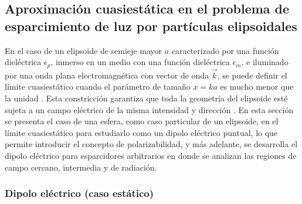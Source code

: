 \hypertarget{primera}{\subsection{Aproximación cuasiestática en el problema de esparcimiento de luz por partículas elipsoidales}}

 En el caso de un elipsoide de semieje mayor $a$ caracterizado por una función dieléctrica $\epsilon_p$, inmerso en un medio con una función dieléctrica $\epsilon_m$, e iluminado por una onda plana electromagnética con vector de onda $\Vec{k}$, se puede definir el límite cuasiestático cuando el parámetro de tamaño $x=ka$ es mucho menor que la unidad \cite{Bohren}. Esta constricción garantiza que toda la geometría del elipsoide esté sujeta a un campo eléctrico de la misma intensidad y dirección \cite{Cuasiestatico}. En esta sección se presenta el caso de una esfera, como caso particular de un elipsoide, en el límite cuasiestático para estudiarlo como un dipolo eléctrico puntual, lo que permite introducir el concepto de polarizabilidad, y más adelante, se desarrolla el dipolo eléctrico para esparcidores arbitrarios en donde se analizan las regiones de campo cercano, intermedia y de radiación.


\subsubsection{Dipolo eléctrico (caso estático)}

